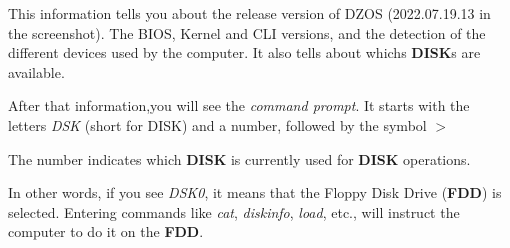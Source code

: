     This information tells you about the release version of DZOS (2022.07.19.13
    in the screenshot). The BIOS, Kernel and CLI versions, and the detection of
    the different devices used by the computer. It also tells about whichs 
    \textbf{DISK}s are available.

    After that information,you will see the \textit{command prompt}. It starts
    with the letters \textit{DSK} (short for DISK) and a number, followed by the
    symbol $>$

    The number indicates which \textbf{DISK} is currently used for \textbf{DISK}
    operations.

    In other words, if you see \textit{DSK0}, it means that the Floppy Disk Drive
    (\textbf{FDD}) is selected. Entering commands like \textit{cat},
    \textit{diskinfo}, \textit{load}, etc., will instruct the computer to do it
    on the \textbf{FDD}.